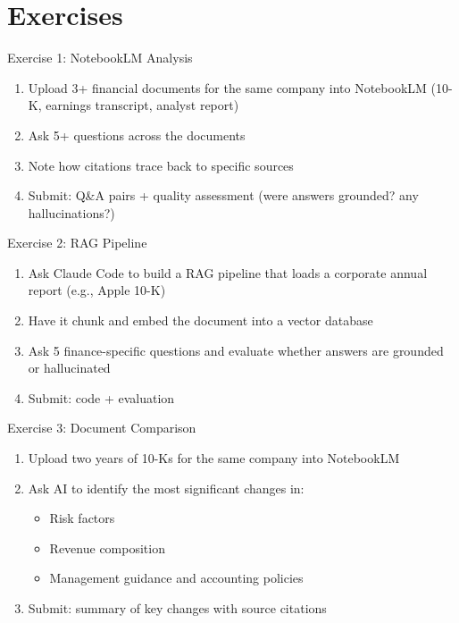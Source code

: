 \documentclass[aspectratio=169]{beamer}
\begin{document}
\section{Exercises}

\begin{frame}{Exercise 1: NotebookLM Analysis}
\begin{enumerate}
  \item Upload 3+ financial documents for the same company into NotebookLM (10-K, earnings transcript, analyst report)
  \item Ask 5+ questions across the documents
  \item Note how citations trace back to specific sources
  \item Submit: Q\&A pairs + quality assessment (were answers grounded? any hallucinations?)
\end{enumerate}
\end{frame}

\begin{frame}{Exercise 2: RAG Pipeline}
\begin{enumerate}
  \item Ask Claude Code to build a RAG pipeline that loads a corporate annual report (e.g., Apple 10-K)
  \item Have it chunk and embed the document into a vector database
  \item Ask 5 finance-specific questions and evaluate whether answers are grounded or hallucinated
  \item Submit: code + evaluation
\end{enumerate}
\end{frame}

\begin{frame}{Exercise 3: Document Comparison}
\begin{enumerate}
  \item Upload two years of 10-Ks for the same company into NotebookLM
  \item Ask AI to identify the most significant changes in:
  \begin{itemize}\small
    \item Risk factors
    \item Revenue composition
    \item Management guidance and accounting policies
  \end{itemize}
  \item Submit: summary of key changes with source citations
\end{enumerate}
\end{frame}
\end{document}

